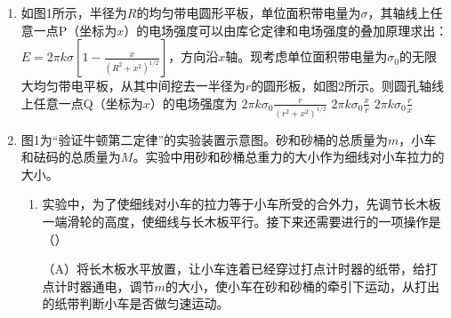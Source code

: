 \documentclass[\gkver]{gaokaozhenti}
\begin{document}
\begin{enumerate}
{由图可得以速度 $v$ 从 A 点沿直径 AOB 方向射入磁场，经过 $\Delta t=T/6$ 从 C 点射出磁场，轨道半径 $r=\sqrt{3}\,AO$；速度变为 $v/3$ 时，运动半径是 $r/3=\frac{\sqrt{3}}{3}AO$，由几何关系可得在磁场中运动转过的圆心角为 $120{^\circ}$，运动时间为 $T/3$，即 $2\Delta t$。

正确选项：B。
}

\item
如图1所示，半径为$R$的均匀带电圆形平板，单位面积带电量为$\sigma$，其轴线上任意一点P（坐标为$x$）的电场强度可以由库仑定律和电场强度的叠加原理求出：$E=2\pi k\sigma\left[1-\frac{x}{(R^{2}+x^{2})^{1/2}}\right]$，方向沿$x$轴。现考虑单位面积带电量为$\sigma_{0}$的无限大均匀带电平板，从其中间挖去一半径为$r$的圆形板，如图2所示。则圆孔轴线上任意一点Q（坐标为$x$）的电场强度为
{$2\pi k\sigma_{0}\frac{r}{(r^{2}+x^{2})^{1/2}}$}
{$2\pi k\sigma_{0}\frac{x}{r}$}
{$2\pi k\sigma_{0}\frac{r}{x}$}

\item
图1为“验证牛顿第二定律”的实验装置示意图。砂和砂桶的总质量为$m$，小车和砝码的总质量为$M$。实验中用砂和砂桶总重力的大小作为细线对小车拉力的大小。
\begin{enumerate}
	\item
	实验中，为了使细线对小车的拉力等于小车所受的合外力，先调节长木板一端滑轮的高度，使细线与长木板平行。接下来还需要进行的一项操作是（\quad）

	（A）将长木板水平放置，让小车连着已经穿过打点计时器的纸带，给打点计时器通电，调节$m$的大小，使小车在砂和砂桶的牵引下运动，从打出的纸带判断小车是否做匀速运动。


\end{enumerate}
\end{enumerate}
\end{document}
